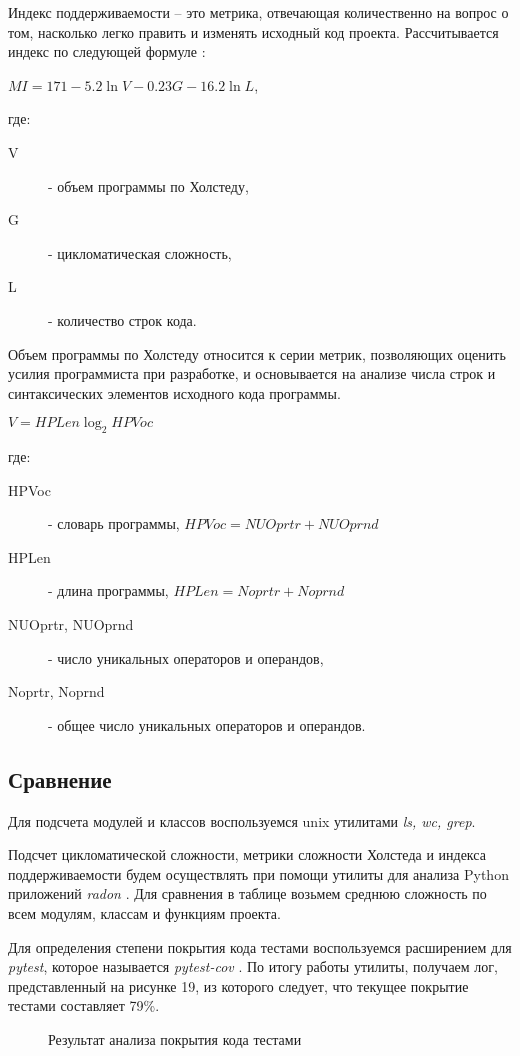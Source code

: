     Индекс поддерживаемости -- это метрика, отвечающая количественно на вопрос
    о том, насколько легко править и изменять исходный код проекта.
    Рассчитывается индекс по следующей формуле \cite{metrics.cmcons}:
    \begin{center}
        $ MI = 171 - 5.2 \ln V - 0.23G - 16.2 \ln L $,
    \end{center}
    где:
    \begin{description}
        \item [V] - объем программы по Холстеду,
        \item [G] - цикломатическая сложность,
        \item [L] - количество строк кода.
    \end{description}

    Объем программы по Холстеду относится к серии метрик, позволяющих оценить
    усилия программиста при разработке, и основывается на анализе числа строк
    и синтаксических элементов исходного кода программы.
    \begin{center}
        $ V = HPLen \log_{2}HPVoc $
    \end{center}
    где:
    \begin{description}
        \item [HPVoc] - словарь программы,
        $ HPVoc = NUOprtr + NUOprnd $
        \item [HPLen] - длина программы,
        $ HPLen = Noprtr + Noprnd $
        \item [NUOprtr, NUOprnd] - число уникальных операторов и операндов,
        \item [Noprtr, Noprnd] - общее число уникальных операторов и операндов.
    \end{description}

    \subsection{Сравнение}
    Для подсчета модулей и классов воспользуемся unix утилитами \textit{ls, wc, grep}.

    Подсчет цикломатической сложности, метрики сложности Холстеда и индекса
    поддерживаемости будем осуществлять при помощи утилиты для
    анализа Python приложений \textit{radon} \cite{complexity.radon}.
    Для сравнения в таблице возьмем среднюю сложность по всем модулям, классам
    и функциям проекта.
    
    Для определения степени покрытия кода тестами воспользуемся расширением для
    \textit{pytest}, которое называется \textit{pytest-cov}
    \cite{test.pytest.cov}.
    По итогу работы утилиты, получаем лог, представленный на рисунке 19,
    из которого следует, что текущее покрытие тестами составляет 79\%.
    \begin{figure}[H]
        \centering
        
        \caption{Результат анализа покрытия кода тестами}
        \label{fig:pytest-coverage}
    \end{figure}

